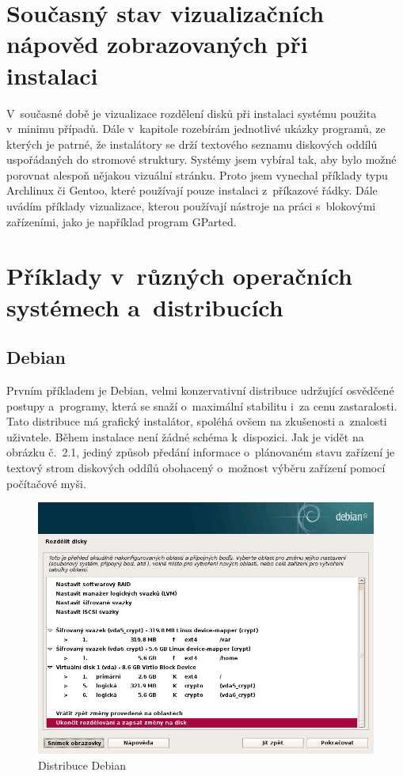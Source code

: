 \documentclass[color,table,oneside,nolot,nolof]{fithesis}
\begin{document}
\section{Současný stav vizualizačních nápověd zobrazovaných při instalaci}
	V~současné době je vizualizace rozdělení disků při instalaci systému použita v~minimu případů. Dále v~kapitole rozebírám jednotlivé ukázky programů, ze kterých je patrné, 
	že instalátory se drží textového seznamu diskových oddílů uspořádaných do stromové struktury. Systémy jsem vybíral tak, aby bylo možné porovnat alespoň nějakou vizuální stránku. Proto jsem vynechal
	příklady typu Archlinux či Gentoo, které používají pouze instalaci z~příkazové řádky.  Dále uvádím příklady vizualizace, kterou používají nástroje na práci s~blokovými zařízeními, 
	jako je například program GParted.

\section{Příklady v~různých operačních systémech a~distribucích}

\subsection{Debian}

	Prvním příkladem je Debian, velmi konzervativní distribuce udržující osvědčené postupy a~programy, která se snaží o~maximální stabilitu i~za cenu zastaralosti. 
	Tato distribuce má grafický instalátor, spoléhá ovšem na zkušenosti a~znalosti uživatele. Během instalace není žádné schéma k~dispozici. Jak je vidět na obrázku č.~2.1, jediný způsob předání 
	informace o~plánovaném stavu zařízení je textový strom diskových oddílů obohacený o~možnost výběru zařízení pomocí počítačové myši.

\begin{figure}[t!]
	\caption{Distribuce Debian}
	\centering
	\includegraphics[width=.8\columnwidth]{pictures/debian1.png}
\end{figure}
\end{document}

